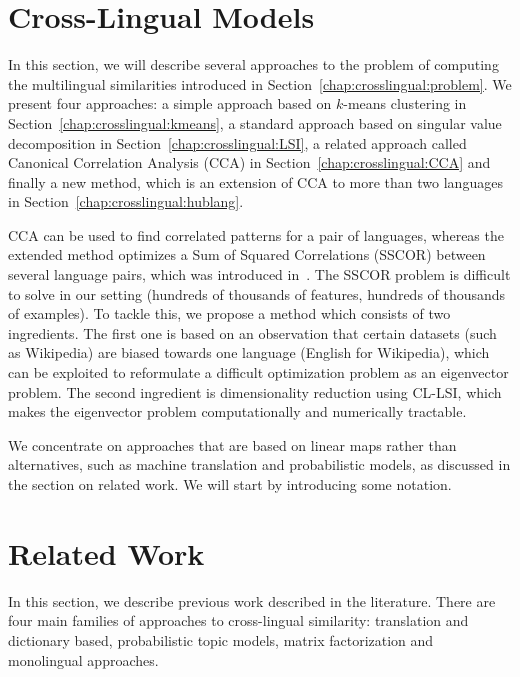 \section{Cross-Lingual Models}\label{chap:crosslingual:models}
In this section, we will describe several approaches to the problem of computing the
multilingual similarities introduced in Section~\ref{chap:crosslingual:problem}. We present four approaches:
a simple approach based on $k$-means clustering in Section~\ref{chap:crosslingual:kmeans}, a standard approach
based on singular value decomposition in Section~\ref{chap:crosslingual:LSI}, a related
approach called Canonical Correlation Analysis (CCA) in Section~\ref{chap:crosslingual:CCA} and finally a
new method, which is an extension of CCA to more than two languages in Section~\ref{chap:crosslingual:hublang}.

CCA can be used to find correlated patterns for a pair of languages, whereas the extended method
optimizes a Sum of Squared Correlations (SSCOR) between several language pairs, which was introduced
in~\cite{Kettenring}. The SSCOR problem is difficult to solve in our setting (hundreds of thousands
of features, hundreds of thousands of examples). To tackle this, we propose a method which consists
of two ingredients. The first one is based on an observation that certain datasets (such as Wikipedia)
are biased towards one language (English for Wikipedia), which can be exploited to reformulate a
difficult optimization problem as an eigenvector problem. The second ingredient is dimensionality
reduction using CL-LSI, which makes the eigenvector problem computationally and numerically tractable.

We concentrate on approaches that are based on linear maps rather than alternatives, such as machine
translation and probabilistic models, as discussed in the section on related work. We will start
by introducing some notation.

\section{Related Work}\label{chap:crosslingual:related}
In this section, we describe previous work described  in the literature. There are four main families of approaches to cross-lingual similarity:
translation and dictionary based, probabilistic topic models, matrix factorization and monolingual approaches.

